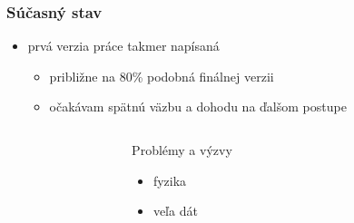 \documentclass{beamer}
\begin{document}
\begin{frame}
	\frametitle{Súčasný stav}
   
	\begin{itemize}
		\item prvá verzia práce takmer napísaná
            \begin{itemize}
                \item približne na 80\% podobná finálnej verzii
                \item očakávam spätnú väzbu a dohodu na ďalšom postupe
            \end{itemize}
	\end{itemize}

    \begin{columns}[T] %
        \begin{column}{0.05\textwidth} %
        \end{column}
        \begin{column}{0.9\textwidth} %
            \begin{block}{Problémy a výzvy}
                \begin{itemize}
                    \item fyzika
                    \item veľa dát
                \end{itemize}
            \end{block}
        \end{column}
        \begin{column}{0.05\textwidth} %
        \end{column}
    \end{columns}
\end{frame}
\end{document}
